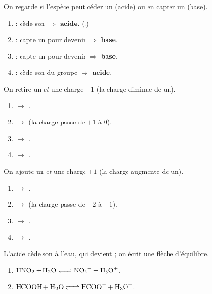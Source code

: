 \documentclass[11pt,a4paper]{article}
\begin{document}

\begin{corrige}
On regarde si l'espèce peut céder un  (acide) ou en capter un (base).
\begin{enumerate}[label=\alph*)]
  \item {} : cède son  $\Rightarrow$ \textbf{acide}. (.)
  \item {} : capte un  pour devenir  $\Rightarrow$ \textbf{base}.
  \item {} : capte un  pour devenir  $\Rightarrow$ \textbf{base}.
  \item {} : cède son  du groupe  $\Rightarrow$ \textbf{acide}.
\end{enumerate}
\end{corrige}

\begin{corrige}
On retire un  \emph{et} une charge $+1$ (la charge diminue de un).
\begin{enumerate}[label=\alph*)]
  \item {} $\to$ .
  \item {} $\to$  (la charge passe de $+1$ à $0$).
  \item {} $\to$ .
  \item {} $\to$ .
\end{enumerate}
\end{corrige}

\begin{corrige}
On ajoute un  \emph{et} une charge $+1$ (la charge augmente de un).
\begin{enumerate}[label=\alph*)]
  \item {} $\to$ .
  \item {} $\to$  (la charge passe de $-2$ à $-1$).
  \item {} $\to$ .
  \item {} $\to$ .
\end{enumerate}
\end{corrige}

\begin{corrige}
L'acide cède son  à l'eau, qui devient  ; on écrit une flèche d'équilibre.
\begin{enumerate}[label=\alph*)]
  \item $\ce{HNO2 + H2O <=> NO2- + H3O+}$.
  \item $\ce{HCOOH + H2O <=> HCOO- + H3O+}$.
\end{enumerate}
\end{corrige}
\end{document}
